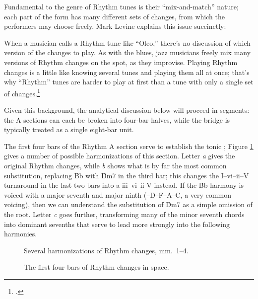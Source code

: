 Fundamental to the genre of Rhythm tunes is their ``mix-and-match'' nature;
each part of the form has many different sets of changes, from which the
performers may choose freely. Mark Levine explains this issue
succinctly:%
%
\begin{quoting}
  \singlespacing
  When a musician calls a Rhythm tune like ``Oleo,'' there's no discussion of
  which version of the changes to play. As with the blues, jazz musicians
  freely mix many versions of Rhythm changes on the spot, as they improvise.
  Playing Rhythm changes is a little like knowing several tunes and playing
  them all at once; that's why ``Rhythm'' tunes are harder to play at first
  than a tune with only a single set of changes.\footcite[241]{levine:1995}
\end{quoting}
%
Given this background, the analytical discussion below will proceed in
segments: the A sections can each be broken into four-bar halves, while the
bridge is typically treated as a single eight-bar unit.

The first four bars of the Rhythm A section serve to establish the tonic \Bflat;
Figure \ref{rcg:rc-first-four} gives a number of possible harmonizations of
this section. Letter \emph{a} gives the original Rhythm changes,
while \emph{b} shows what is by far the most common substitution,
replacing \h{Bb} with \h{Dm7} in the third bar; this changes the
I--vi--ii--V turnaround in the last two bars into a iii--vi--ii-V instead. If
the \h{Bb} harmony is voiced with a major seventh and major ninth
(\Bflat--D--F--A--C, a very common voicing), then we can understand the
substitution of \h{Dm7} as a simple omission of the root. Letter \emph{c}
goes further, transforming many of the minor seventh chords into dominant
sevenths that serve to lead more strongly into the following harmonies.

\begin{figure}[tbp]
  \caption{Several harmonizations of Rhythm changes, mm.~1--4.}
  \label{rcg:rc-first-four}
\end{figure}

\begin{figure}[tbp]
  \caption{The first four bars of Rhythm changes in \tf space.}
  \label{rcg:rc-first-four-space}
\end{figure}

